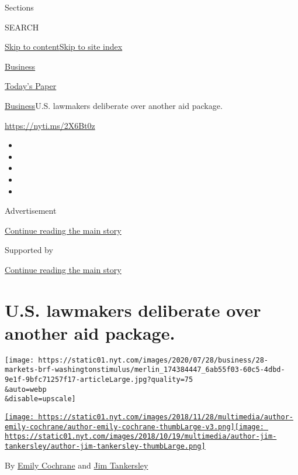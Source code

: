 Sections

SEARCH

\protect\hyperlink{site-content}{Skip to
content}\protect\hyperlink{site-index}{Skip to site index}

\href{https://www.nytimes.com/section/business}{Business}

\href{https://myaccount.nytimes.com/auth/login?response_type=cookie\&client_id=vi}{}

\href{https://www.nytimes.com/section/todayspaper}{Today's Paper}

\href{/section/business}{Business}\textbar{}U.S. lawmakers deliberate
over another aid package.

\url{https://nyti.ms/2X6Bt0z}

\begin{itemize}
\item
\item
\item
\item
\item
\end{itemize}

Advertisement

\protect\hyperlink{after-top}{Continue reading the main story}

Supported by

\protect\hyperlink{after-sponsor}{Continue reading the main story}

\hypertarget{us-lawmakers-deliberate-over-another-aid-package}{%
\section{U.S. lawmakers deliberate over another aid
package.}\label{us-lawmakers-deliberate-over-another-aid-package}}

\texttt{[image: https://static01.nyt.com/images/2020/07/28/business/28-markets-brf-washingtonstimulus/merlin\_174384447\_6ab55f03-60c5-4dbd-9e1f-9bfc71257f17-articleLarge.jpg?quality=75\\\&auto=webp\\\&disable=upscale]}

\href{https://www.nytimes.com/by/emily-cochrane}{\texttt{[image: https://static01.nyt.com/images/2018/11/28/multimedia/author-emily-cochrane/author-emily-cochrane-thumbLarge-v3.png]}}\href{https://www.nytimes.com/by/jim-tankersley}{\texttt{[image: https://static01.nyt.com/images/2018/10/19/multimedia/author-jim-tankersley/author-jim-tankersley-thumbLarge.png]}}

By \href{https://www.nytimes.com/by/emily-cochrane}{Emily Cochrane} and
\href{https://www.nytimes.com/by/jim-tankersley}{Jim Tankersley}

